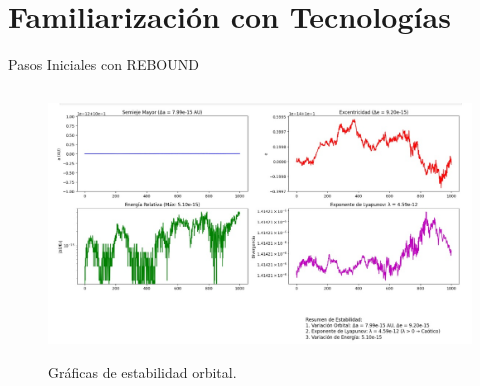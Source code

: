 \section[Familiarización]{Familiarización con Tecnologías}
\begin{frame}{Pasos Iniciales con REBOUND}
    \begin{columns}[T]
        \begin{column}{0.55\textwidth}
            \begin{figure}
                \centering
                \href{https://github.com/CARBAJE/collision_of_two_bodies/blob/main/tests/prueba_2.ipynb}{%
                \includegraphics[width=\textwidth]{img/conclusion/metricas.jpeg}
                }
                \caption{Gráficas de estabilidad orbital.}
            \end{figure}
        \end{column}


\end{columns}
\end{frame}

